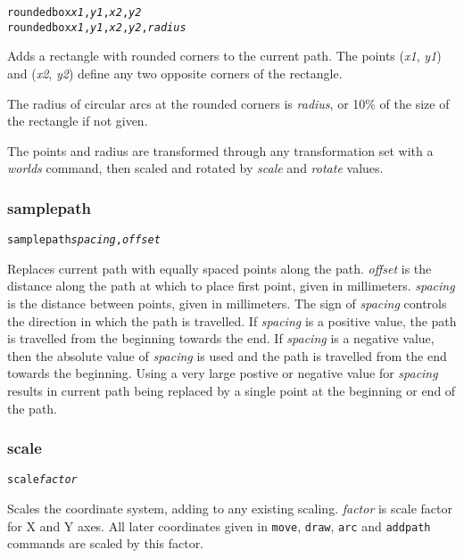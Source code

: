\begin{alltt}
roundedbox \textit{x1}, \textit{y1}, \textit{x2}, \textit{y2}
roundedbox \textit{x1}, \textit{y1}, \textit{x2}, \textit{y2}, \textit{radius}
\end{alltt}

Adds a rectangle with rounded corners to the current path.
The points
(\textit{x1}, \textit{y1}) and (\textit{x2}, \textit{y2}) define
any two opposite corners of the rectangle.

The radius of circular arcs at the rounded corners is 
\textit{radius}, or 10\% of the size of the rectangle if not given.

The points and radius are transformed through any
transformation set with a \textit{worlds} command,
then scaled and rotated by \textit{scale}
and \textit{rotate} values.

\subsubsection{samplepath}

\begin{alltt}
samplepath \textit{spacing}, \textit{offset}
\end{alltt}

Replaces current path with equally spaced points along the path.
\textit{offset} is the distance along the path at which to place first point,
given in millimeters.  \textit{spacing} is the distance between points, given
in millimeters.  The sign of \textit{spacing} controls the direction in which
the path is travelled.  If \textit{spacing} is a positive value, the path is
travelled from the beginning towards the end.  If \textit{spacing} is a
negative value, then the absolute value of \textit{spacing} is used and the
path is travelled from the end towards the beginning.  Using a very large
postive or negative value for \textit{spacing} results in current path being
replaced by a single point at the beginning or end of the path.

\subsubsection{scale}

\begin{alltt}
scale \textit{factor}
\end{alltt}

Scales the coordinate system, adding to any existing scaling.  \textit{factor}
is scale factor for X and Y axes.  All later coordinates given in
\texttt{move}, \texttt{draw}, \texttt{arc} and \texttt{addpath} commands are
scaled by this factor.

